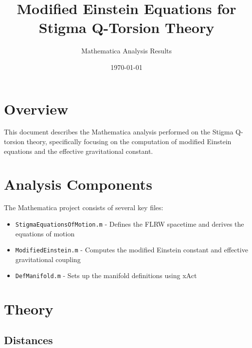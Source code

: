 \documentclass{article}
\title{Modified Einstein Equations for Stigma Q-Torsion Theory}
\author{Mathematica Analysis Results}
\date{\today}
\begin{document}
\maketitle

\section{Overview}

This document describes the Mathematica analysis performed on the Stigma Q-torsion theory, specifically focusing on the computation of modified Einstein equations and the effective gravitational constant.

\section{Analysis Components}

The Mathematica project consists of several key files:

\begin{itemize}
    \item \texttt{StigmaEquationsOfMotion.m} - Defines the FLRW spacetime and derives the equations of motion
    \item \texttt{ModifiedEinstein.m} - Computes the modified Einstein constant and effective gravitational coupling
    \item \texttt{DefManifold.m} - Sets up the manifold definitions using xAct
\end{itemize}

\section{Theory}
\subsection{Distances}
\end{document}
